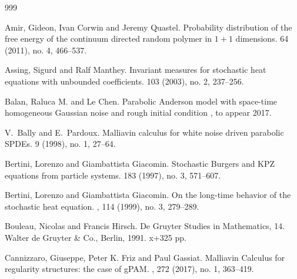 \documentclass[a4paper,11pt]{article}
\theoremstyle{plain}
\theoremstyle{definition}
\numberwithin{NQ}{section}
\numberwithin{LQ}{section}
\numberwithin{ZQ}{section}
\begin{document}
\begin{small}
\begin{thebibliography}{999}




Amir, Gideon, Ivan Corwin and Jeremy Quastel.
\newblock Probability distribution of the free energy of the continuum directed random polymer in $1+1 $ dimensions. 
 64 (2011), no. 4, 466--537. 


%


Assing, Sigurd and Ralf Manthey.
\newblock Invariant measures for stochastic heat equations with unbounded coefficients. 
 103 (2003), no. 2, 237--256.


% 

Balan, Raluca M. and Le Chen.
\newblock Parabolic Anderson model with space-time homogeneous Gaussian noise and rough initial condition
, to appear 2017. 

V.~Bally and E.~Pardoux.
\newblock Malliavin calculus for white noise driven parabolic {SPDEs}.
 9 (1998), no. 1, 27--64.

Bertini, Lorenzo and Giambattista Giacomin.
\newblock Stochastic Burgers and KPZ equations from particle systems. 
 183 (1997), no. 3, 571--607. 

Bertini, Lorenzo and Giambattista Giacomin.
\newblock On the long-time behavior of the stochastic heat equation.
, 114 (1999), no. 3, 279--289.

Bouleau, Nicolas and Francis Hirsch. 
\newblock De Gruyter Studies in Mathematics, 14. Walter de Gruyter \& Co., Berlin, 1991. x+325 pp.

Cannizzaro, Giuseppe, Peter K. Friz and Paul Gassiat.
\newblock Malliavin Calculus for regularity structures: the case of gPAM.
, 272 (2017), no. 1, 363--419.




\end{thebibliography}
\end{small}
\end{document}
